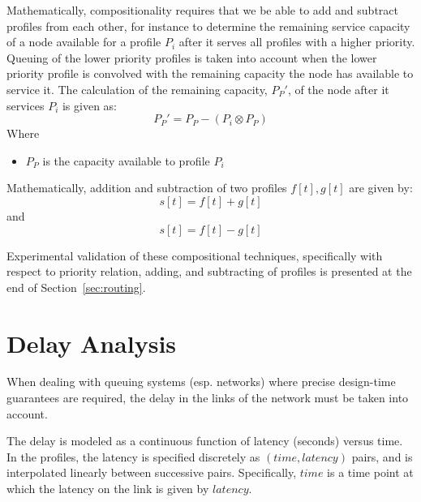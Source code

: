 Mathematically, compositionality requires that we be able to add and
subtract profiles from each other, for instance to determine the
remaining service capacity of a node available for a profile $P_i$
after it serves all profiles with a higher priority.  Queuing of the
lower priority profiles is taken into account when the lower priority
profile is convolved with the remaining capacity the node has
available to service it.  The calculation of the remaining capacity,
$P_P'$, of the node after it services $P_i$ is given as:
\begin{equation}
  P_P' = P_P - ( P_i \otimes P_P )
\end{equation}
Where
\begin{itemize}
\item $P_P$ is the capacity available to profile $P_i$
\end{itemize}

Mathematically, addition and subtraction of two profiles $f[t],g[t]$ are given by:
\begin{equation}
  s[t] = f[t] + g[t]
\end{equation}
and
\begin{equation}
  s[t] = f[t] - g[t]
\end{equation}

Experimental validation of these compositional techniques,
specifically with respect to priority relation, adding, and
subtracting of profiles is presented at the end of
Section~\ref{sec:routing}.

\newpage

\section{Delay Analysis}
\label{sec:delay}

When dealing with queuing systems (esp. networks) where precise
design-time guarantees are required, the delay in the links of the
network must be taken into account.

The delay is modeled as a continuous function of latency (seconds)
versus time.  In the profiles, the latency is specified discretely as
$(time, latency)$ pairs, and is interpolated linearly between
successive pairs.  Specifically, $time$ is a time point at which the
latency on the link is given by $latency$.  

